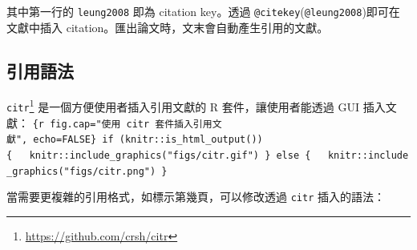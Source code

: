 \documentclass[]{book}
\renewcommand{\href}[2]{#2\footnote{\url{#1}}}
\begin{document}
其中第一行的 \texttt{leung2008} 即為 citation key。透過
\texttt{@citekey}(\texttt{@leung2008})即可在文獻中插入
citation。匯出論文時，文末會自動產生引用的文獻。

\hypertarget{cite-syntax}{%
\subsection{引用語法}\label{cite-syntax}}

\href{https://github.com/crsh/citr}{\texttt{citr}}
是一個方便使用者插入引用文獻的 R 套件，讓使用者能透過 GUI 插入文獻：
\texttt{\{r\ fig.cap="使用\ citr\ 套件插入引用文獻",\ echo=FALSE\}\ if\ (knitr::is\_html\_output())\{\ \ \ knitr::include\_graphics("figs/citr.gif")\ \}\ else\ \{\ \ \ knitr::include\_graphics("figs/citr.png")\ \}}

當需要更複雜的引用格式，如標示第幾頁，可以修改透過 \texttt{citr}
插入的語法：
\end{document}
